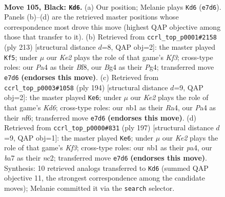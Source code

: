 \documentclass[11pt]{article}
\begin{document}
\clearpage

\begin{figure}[p]\centering
\begin{subfigure}{0.46\textwidth}\centering
\resizebox{\linewidth}{!}{%
\newchessgame
\chessboard[
  setfen={8/B3k3/8/8/p1p3b1/8/5K2/1N6 b - - 65 105},
  showmover=false,
  pgfstyle=straightmove, color=movearrow, markmove={e7-d6}
]}
\caption{}
\end{subfigure}\hfill
\begin{subfigure}{0.46\textwidth}\centering
\resizebox{\linewidth}{!}{%
\newchessgame
\chessboard[
  setfen={5b2/1B6/5k2/8/5pp1/8/6K1/8 b - - 95 107},
  showmover=false,
  pgfstyle=straightmove, color=movearrow, markmove={f6-f5}
]}
\caption{}
\end{subfigure}
\\[4pt]
\begin{subfigure}{0.46\textwidth}\centering
\resizebox{\linewidth}{!}{%
\newchessgame
\chessboard[
  setfen={8/8/3K1n2/8/R7/2k5/8/4bB2 w - - 35 98},
  showmover=false,
  pgfstyle=straightmove, color=movearrow, markmove={d6-e6}
]}
\caption{}
\end{subfigure}\hfill
\begin{subfigure}{0.46\textwidth}\centering
\resizebox{\linewidth}{!}{%
\newchessgame
\chessboard[
  setfen={8/8/5k2/p7/P2K4/8/2N1p3/8 b - - 65 99},
  showmover=false,
  pgfstyle=straightmove, color=movearrow, markmove={f6-e6}
]}
\caption{}
\end{subfigure}
\caption{\textbf{Move 105, Black: \texttt{Kd6}.} (a) Our position; Melanie plays \texttt{Kd6} (\texttt{e7d6}). Panels (b)--(d) are the retrieved master positions whose correspondence most drove this move (highest QAP objective among those that transfer to it). (b) Retrieved from \texttt{ccrl\_top\_p0001\#2158} (ply 213) [structural distance $d$=8, QAP obj=2]: the master played \texttt{Kf5}; under $\mu$ our \emph{Ke2} plays the role of that game's \emph{Kf3}; cross-type roles: our \emph{P}a4 as their \emph{B}f8, our \emph{B}g4 as their \emph{P}g4; transferred move \texttt{e7d6} \textbf{(endorses this move)}. (c) Retrieved from \texttt{ccrl\_top\_p0003\#1058} (ply 194) [structural distance $d$=9, QAP obj=2]: the master played \texttt{Ke6}; under $\mu$ our \emph{Ke2} plays the role of that game's \emph{Kd6}; cross-type roles: our \emph{n}b1 as their \emph{R}a4, our \emph{P}a4 as their \emph{n}f6; transferred move \texttt{e7d6} \textbf{(endorses this move)}. (d) Retrieved from \texttt{ccrl\_top\_p0000\#831} (ply 197) [structural distance $d$=9, QAP obj=1]: the master played \texttt{Ke6}; under $\mu$ our \emph{Ke2} plays the role of that game's \emph{Kf3}; cross-type roles: our \emph{n}b1 as their \emph{p}a4, our \emph{b}a7 as their \emph{n}c2; transferred move \texttt{e7d6} \textbf{(endorses this move)}. Synthesis: 10 retrieved analogs transferred to \texttt{Kd6} (summed QAP objective 11, the strongest correspondence among the candidate moves); Melanie committed it via the \texttt{search} selector.}
\label{fig:thought-m209}
\end{figure}
\end{document}
